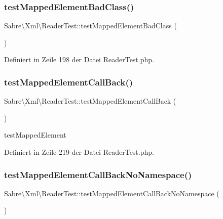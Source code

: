 \subsubsection{\texorpdfstring{test\+Mapped\+Element\+Bad\+Class()}{testMappedElementBadClass()}}
{\footnotesize\ttfamily Sabre\textbackslash{}\+Xml\textbackslash{}\+Reader\+Test\+::test\+Mapped\+Element\+Bad\+Class (\begin{DoxyParamCaption}{ }\end{DoxyParamCaption})}



Definiert in Zeile 198 der Datei Reader\+Test.\+php.

\mbox{\label{class_sabre_1_1_xml_1_1_reader_test_aa9b25ecc0b01c88a140831ce15f0f9a4}} 
\subsubsection{\texorpdfstring{test\+Mapped\+Element\+Call\+Back()}{testMappedElementCallBack()}}
{\footnotesize\ttfamily Sabre\textbackslash{}\+Xml\textbackslash{}\+Reader\+Test\+::test\+Mapped\+Element\+Call\+Back (\begin{DoxyParamCaption}{ }\end{DoxyParamCaption})}

test\+Mapped\+Element 

Definiert in Zeile 219 der Datei Reader\+Test.\+php.

\mbox{\label{class_sabre_1_1_xml_1_1_reader_test_ad3047108a43b360a7d0d492033399481}} 
\subsubsection{\texorpdfstring{test\+Mapped\+Element\+Call\+Back\+No\+Namespace()}{testMappedElementCallBackNoNamespace()}}
{\footnotesize\ttfamily Sabre\textbackslash{}\+Xml\textbackslash{}\+Reader\+Test\+::test\+Mapped\+Element\+Call\+Back\+No\+Namespace (\begin{DoxyParamCaption}{ }\end{DoxyParamCaption})}

